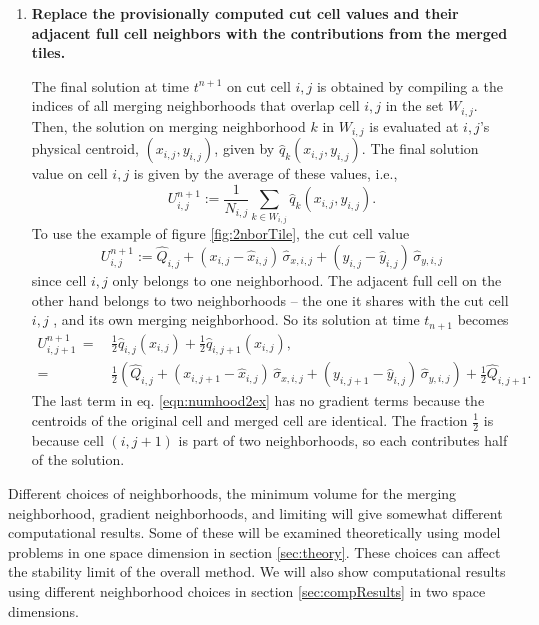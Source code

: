 \begin{enumerate}
\item
{\bf Replace the provisionally computed cut cell values and their adjacent
full cell neighbors with  the contributions from the merged tiles.} 

\vspace*{.1in}
The final solution at time $t^{n+1}$ on cut cell $i,j$ is obtained by compiling a the indices of all merging neighborhoods that overlap cell $i,j$ in the set $W_{i,j}$.  Then, the solution on merging neighborhood $k$ in $W_{i,j}$ is evaluated at $i,j$'s physical centroid, $(x_{i,j},y_{i,j})$, given by $\hat{q}_{k}(x_{i,j},y_{i,j})$.  The final solution value on cell $i,j$ is given by the average of these values, i.e.,
\begin{equation} \label{eq:final_update_linear}
U^{n+1}_{i,j} := \frac{1}{N_{i,j}}\sum_{k \in W_{i,j}}\hat{q}_{k}(x_{i,j},y_{i,j}).
\end{equation}
To use the example of figure \ref{fig:2nborTile}, the cut cell value
\begin{equation}
   U_{i,j}^{n+1} := \widehat{Q}_{i,j} 
   + ( x_{i,j} - \widehat x_{i,j}) \, \widehat{\sigma}_{x,i,j}
   + ( y_{i,j} - \widehat y_{i,j}) \, \widehat{\sigma}_{y,i,j}
\end{equation}
since cell ${i,j}$ only belongs to one neighborhood. The adjacent full cell
on the other hand belongs to two neighborhoods -- the one it shares with
the cut cell $i,j$ , and its own merging neighborhood.
So its solution at time $t_{n+1}$  becomes
\begin{equation}
\label{eqn:numhood2ex}
\begin{split}
   U_{i,j+1}^{n+1} \,=\, & \frac{1}{2}\widehat{q}_{i,j}(x_{i,j})+ \frac{1}{2} \widehat{q}_{i,j+1}(x_{i,j}), \\
   = &\frac{1}{2} \left
   (\widehat{Q}_{i,j} 
   + ( x_{i,j+1} - \widehat x_{i,j}) \, \widehat{\sigma}_{x,i,j}
   + ( y_{i,j+1} - \widehat y_{i,j}) \, \widehat{\sigma}_{y,i,j} \right ) + \frac{1}{2} \widehat{Q}_{i,j+1} .
\end{split}
\end{equation}
The last term  in eq. \eqref{eqn:numhood2ex} has no gradient terms because the
centroids of the original cell and merged cell are identical.
The fraction $\frac{1}{2}$ is because cell $(i,j+1)$ is part of  two
neighborhoods, so each contributes half of the solution.
\end{enumerate}

Different choices of neighborhoods, the minimum volume for the merging
neighborhood, gradient neighborhoods, and limiting will give
somewhat different computational results. Some of these will be examined
theoretically using model problems in one space dimension in section
\ref{sec:theory}. These choices can affect the stability limit of the
overall method.
We will also show computational results using different neighborhood
choices in section \ref{sec:compResults} in two space dimensions.

